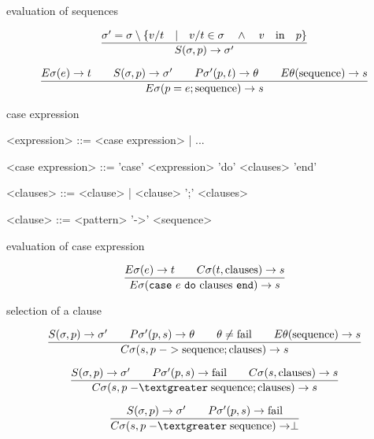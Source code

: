 \begin{frame}{evaluation of sequences}


$$\frac{\sigma' = \sigma \setminus \lbrace v/t \quad | \quad v/t \in \sigma \quad \wedge \quad  v \quad {\rm in} \quad p\rbrace}{S(\sigma, p) \rightarrow \sigma'}$$
  

$$\frac{   
  E\sigma(e) \rightarrow t
  \qquad S(\sigma, p) \rightarrow \sigma' 
  \qquad P\sigma'(p, t) \rightarrow \theta
  \qquad E\theta({\rm sequence}) \rightarrow s
}{E\sigma(p = e; {\rm sequence}) \rightarrow s}$$ 


\end{frame}


\begin{frame}{case expression}

\begin{grammar}
     <expression> ::=  <case expression> | ...  

     <case expression> ::= 'case' <expression> 'do' <clauses>  'end' 

     <clauses> ::=   <clause> | <clause> ';' <clauses>

     <clause> ::=  <pattern> '->' <sequence>
\end{grammar}
\end{frame}

\begin{frame}{evaluation of case expression}


$$\frac{E\sigma(e) \rightarrow t \qquad C\sigma(t, {\rm clauses}) \rightarrow s }{E\sigma({\tt case}\ e \ {\tt do}\ {\rm clauses} \ {\tt end}) \rightarrow s}$$
  
\end{frame}
\begin{frame}{selection of a clause}

$$\frac{
  S(\sigma, p) \rightarrow \sigma' \qquad
  P\sigma'(p, s) \rightarrow \theta \qquad
  \theta \not = {\rm fail} \qquad
  E\theta({\rm sequence}) \rightarrow s}{
C\sigma(s, p \;{\rm ->}\;    {\rm sequence} ; {\rm clauses}) \rightarrow s}$$

\vspace{10pt}

$$\frac{
  S(\sigma, p) \rightarrow \sigma'   \qquad
  P\sigma'(p, s) \rightarrow {\rm fail} \qquad
  C\sigma(s, {\rm clauses}) \rightarrow s}{
C\sigma(s, p \;{\rm -\textgreater}\;  {\rm sequence} ; {\rm clauses}) \rightarrow s}$$

\vspace{10pt}

$$\frac{
  S(\sigma, p) \rightarrow \sigma' \qquad
  P\sigma'(p, s) \rightarrow {\rm fail} }{
C\sigma(s, p \;{\rm -\textgreater}\;  {\rm sequence}) \rightarrow \perp}$$


\end{frame}


